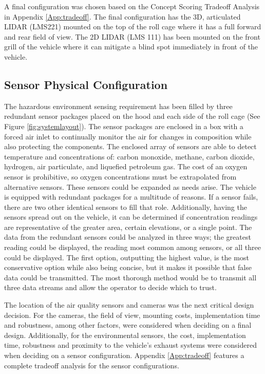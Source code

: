 A final configuration was chosen based on the Concept Scoring Tradeoff Analysis in Appendix \ref{App:tradeoff}. The final configuration has the 3D, articulated LIDAR (LMS221) mounted on the top of the roll cage where it has a full forward and rear field of view. The 2D LIDAR (LMS 111) has been mounted on the front grill of the vehicle where it can mitigate a blind spot immediately in front of the vehicle. 


\subsection{Sensor Physical Configuration}
The hazardous environment sensing requirement has been filled by three redundant sensor packages placed on the hood and each side of the roll cage (See Figure \ref{fig:systemlayout}). The sensor packages  are enclosed in a box with a forced air inlet to continually monitor the air for changes in composition while also protecting the components. The enclosed array of sensors are able to detect temperature and concentrations of: carbon monoxide, methane, carbon dioxide, hydrogen, air particulate, and liquefied petroleum gas. The cost of an oxygen sensor is prohibitive, so oxygen concentrations must be extrapolated from alternative sensors. These sensors could be expanded as needs arise. The vehicle is equipped with redundant packages for a multitude of reasons. If a sensor fails, there are two other identical sensors to fill that role. Additionally, having the sensors spread out on the vehicle, it can be determined if concentration readings are representative of the greater area, certain elevations, or a single point. The data from the redundant sensors could be analyzed in three ways; the greatest reading could be displayed, the reading most common among sensors, or all three could be displayed. The first option, outputting the highest value, is the most conservative option while also being concise, but it makes it possible that false data could be transmitted. The most thorough method would be to transmit all three data streams and allow the operator to decide which to trust. 

The location of the air quality sensors and cameras was the next critical design decision. For the cameras, the field of view, mounting costs, implementation time and robustness, among other factors, were considered when deciding on a final design. Additionally, for the environmental sensors, the cost, implementation time, robustness and proximity to the vehicle's exhaust systems were considered when deciding on a sensor configuration. Appendix \ref{App:tradeoff} features a complete tradeoff analysis for the sensor configurations. 

